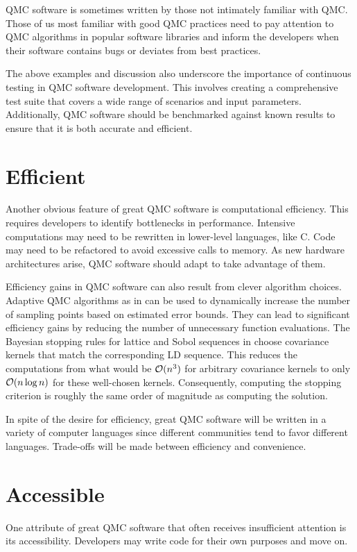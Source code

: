 \documentclass[graybox]{svmult}
\begin{document}
QMC software is sometimes written by those not intimately familiar with QMC.  Those of us most familiar with good QMC practices need to pay attention to QMC algorithms in popular software libraries and inform the developers when their software contains bugs or deviates from best practices.

The above examples and discussion also underscore the importance of continuous testing in QMC software development. This involves creating a comprehensive test suite that covers a wide range of scenarios and input parameters. Additionally, QMC software should be benchmarked against known results to ensure that it is both accurate and efficient.


\section{Efficient} \label{CDHJS_sec:efficient}
Another obvious feature of great QMC software is computational efficiency.  This requires developers to identify bottlenecks in performance.  Intensive computations may need to be rewritten in lower-level languages, like C.  Code may need to be refactored to avoid excessive calls to memory.  As new hardware architectures arise, QMC software should adapt to take advantage of them.

Efficiency gains in QMC software can also result from clever algorithm choices. Adaptive QMC algorithms as in \cite{JimHic16a, HicJim16a, HicEtal17a, RatHic19a,JagHic22a} can be used to dynamically increase the number of sampling points based on estimated error bounds. They can lead to significant efficiency gains by reducing the number of unnecessary function evaluations. The Bayesian stopping rules for lattice and Sobol sequences in \cite{RatHic19a,JagHic22a} choose covariance kernels that match the corresponding LD sequence.  This reduces the computations from what would be ${\mathcal{O}}(n^3)$ for arbitrary covariance kernels to only ${\mathcal{O}}(n \log n)$ for these well-chosen kernels. Consequently, computing the stopping criterion is roughly the same order of magnitude as computing the solution.

In spite of the desire for efficiency, great QMC software will be written in a variety of computer languages since different communities tend to favor different languages. Trade-offs will be made between efficiency and convenience.

\section{Accessible} \label{CDHJS_sec:accessible}
One attribute of great QMC software that often receives insufficient attention is its accessibility.  Developers may write code for their own purposes and move on.
\end{document}
